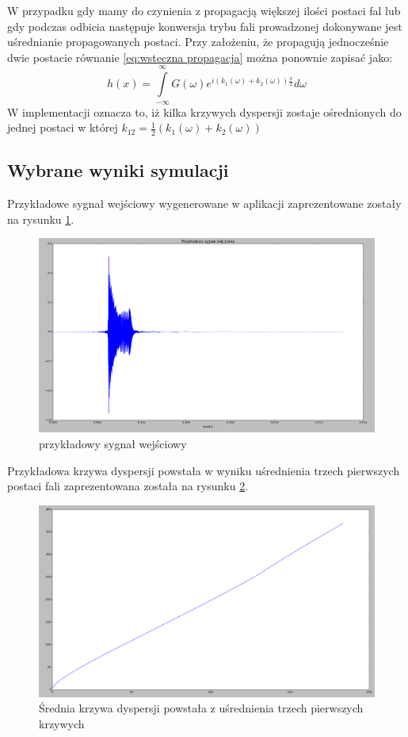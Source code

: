 W przypadku gdy mamy do czynienia z propagacją większej ilości postaci fal lub gdy podczas odbicia następuje konwersja trybu fali prowadzonej dokonywane jest uśrednianie propagowanych postaci. Przy założeniu, że propagują jednocześnie dwie postacie równanie \ref{eq:wsteczna propagacja} można ponownie zapisać jako:
\begin{equation}
h(x) = \int\limits _{-\infty}^{\infty}G(\omega)e^{i(k_1(\omega)+k_2(\omega))\frac{x}{2}}d\omega \label{eq:wiele postaci}
\end{equation}
W implementacji oznacza to, iż kilka krzywych dyspersji zostaje ośrednionych do jednej postaci w której $k_{12} = \frac{1}{2}(k_1(\omega) + k_2(\omega))$
\subsection{Wybrane wyniki symulacji}
Przykładowe sygnał wejściowy wygenerowane w aplikacji zaprezentowane zostały na rysunku \ref{fig:przykl_we}.
\begin{figure}[h]
\centering
\includegraphics[width=14cm]{Zdjecia/4/przykl_we}
\caption{przykładowy sygnał wejściowy}
\label{fig:przykl_we}
\end{figure}
Przykładowa krzywa dyspersji powstała w wyniku uśrednienia trzech pierwszych postaci fali zaprezentowana została na rysunku \ref{fig:mean}. 
\begin{figure}[h]
\centering
\includegraphics[width=14cm]{Zdjecia/4/meanmode}
\caption{Średnia krzywa dyspersji powstała z uśrednienia trzech pierwszych krzywych}
\label{fig:mean}
\end{figure}
